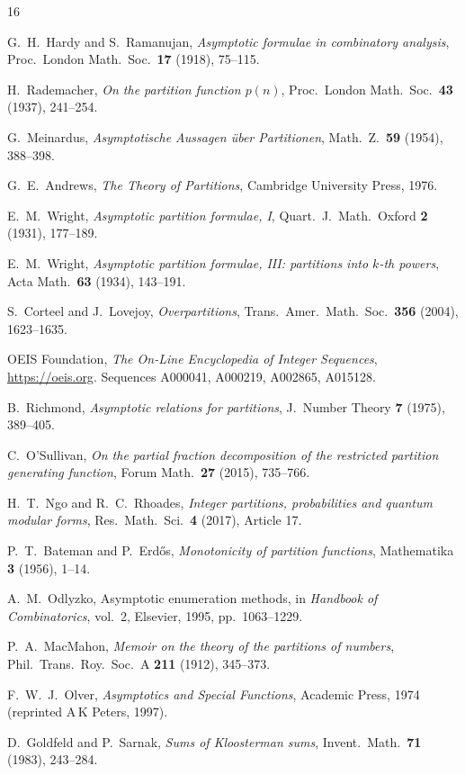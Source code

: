\documentclass[11pt,a4paper]{article}
\begin{document}
\begin{thebibliography}{16}

G.~H.~Hardy and S.~Ramanujan,
\textit{Asymptotic formulae in combinatory analysis},
Proc.\ London Math.\ Soc.\ \textbf{17} (1918), 75--115.

H.~Rademacher,
\textit{On the partition function $p(n)$},
Proc.\ London Math.\ Soc.\ \textbf{43} (1937), 241--254.

G.~Meinardus,
\textit{Asymptotische Aussagen \"uber Partitionen},
Math.\ Z.\ \textbf{59} (1954), 388--398.

G.~E.~Andrews,
\emph{The Theory of Partitions},
Cambridge University Press, 1976.

E.~M.~Wright,
\textit{Asymptotic partition formulae, I},
Quart.\ J.\ Math.\ Oxford \textbf{2} (1931), 177--189.

E.~M.~Wright,
\textit{Asymptotic partition formulae, III: partitions into $k$-th powers},
Acta Math.\ \textbf{63} (1934), 143--191.

S.~Corteel and J.~Lovejoy,
\textit{Overpartitions},
Trans.\ Amer.\ Math.\ Soc.\ \textbf{356} (2004), 1623--1635.

OEIS Foundation,
\emph{The On-Line Encyclopedia of Integer Sequences},
\url{https://oeis.org}. Sequences A000041, A000219, A002865, A015128.

B.~Richmond,
\textit{Asymptotic relations for partitions},
J.\ Number Theory \textbf{7} (1975), 389--405.

C.~O'Sullivan,
\textit{On the partial fraction decomposition of the restricted partition generating function},
Forum Math.\ \textbf{27} (2015), 735--766.

H.~T.~Ngo and R.~C.~Rhoades,
\textit{Integer partitions, probabilities and quantum modular forms},
Res.\ Math.\ Sci.\ \textbf{4} (2017), Article 17.

P.~T.~Bateman and P.~Erd\H{o}s,
\textit{Monotonicity of partition functions},
Mathematika \textbf{3} (1956), 1--14.

A.~M.~Odlyzko,
Asymptotic enumeration methods, in
\emph{Handbook of Combinatorics}, vol.~2, Elsevier, 1995, pp.~1063--1229.

P.~A.~MacMahon,
\textit{Memoir on the theory of the partitions of numbers},
Phil.\ Trans.\ Roy.\ Soc.\ A \textbf{211} (1912), 345--373.

F.~W.~J.~Olver,
\emph{Asymptotics and Special Functions},
Academic Press, 1974 (reprinted A\,K Peters, 1997).

D.~Goldfeld and P.~Sarnak,
\textit{Sums of Kloosterman sums},
Invent.\ Math.\ \textbf{71} (1983), 243--284.

\end{thebibliography}
\end{document}
